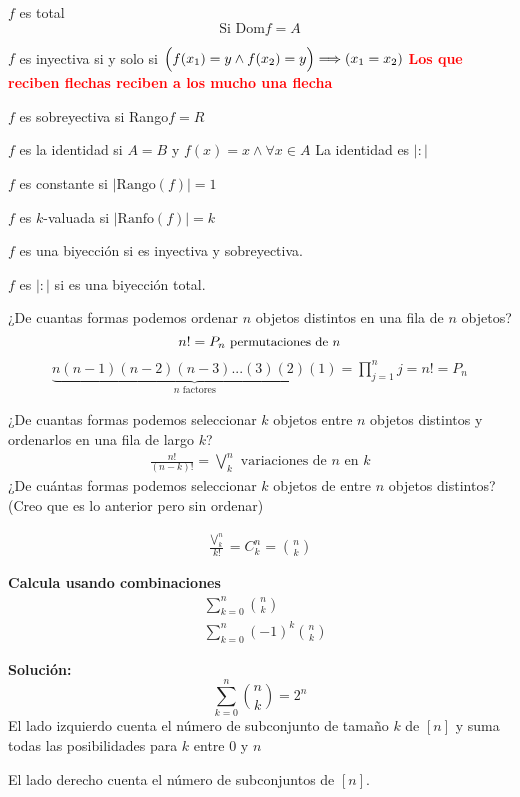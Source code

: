 \documentclass[../main.tex]{subfiles}
\begin{document}
$f$ es total
\[\text{Si Dom}f=A\]

$f$ es inyectiva si y solo si $\Big{(}f(x_1)=y\wedge f(x_2)=y\Big{)}\Longrightarrow(x_1=x_2)$
\textcolor{red}{ \textbf{Los que reciben flechas reciben a los mucho una flecha}}

$f$ es sobreyectiva si Rango$f=R$

$f$ es la identidad si $A=B$ y $f(x)=x \wedge \forall x\in A$
La identidad es $|:|$

$f$ es constante si $|\text{Rango}(f)|=1$

$f$ es $k$-valuada si $|\text{Ranfo}(f)|=k$

$f$ es una biyección si es inyectiva y sobreyectiva.

$f$ es $|:|$ si es una biyección total.

¿De cuantas formas podemos ordenar $n$ objetos distintos en una fila de $n$ objetos?
{\Huge
	\[n!=P_n\text{\small\ permutaciones de $n$}\]
}
\begin{align*}
	\underbrace{n(n-1)(n-2)(n-3)...(3)(2)(1)}_{\text{$n$ factores}}
	= \prod^n_{j=1}j=n!=P_n
\end{align*}

¿De cuantas formas podemos seleccionar $k$ objetos entre $n$ objetos distintos y
ordenarlos en una fila de largo $k$?
\begin{align*}
	\frac{n!}{(n-k)!} = \bigvee^n_k \text{\ variaciones de $n$ en $k$}
\end{align*}
¿De cuántas formas podemos seleccionar $k$ objetos de entre $n$ objetos distintos?
(Creo que es lo anterior pero sin ordenar)

\begin{align*}
	\frac{\bigvee^n_k}{k!}= C^n_k =
	\binom{n}{k}
\end{align*}

\textbf{Calcula usando combinaciones }
\begin{align*}
	&\sum^n_{k=0}\binom{n}{k}\\
	&\sum^n_{k=0}(-1)^k\binom{n}{k}
\end{align*}

\textbf{Solución:}
\[
	\sum_{k=0}^n\binom{n}{k}=2^n
\]
El lado izquierdo cuenta el número de subconjunto de tamaño $k$
de $[n]$ y suma todas las posibilidades para $k$ entre $0$ y $n$

El lado derecho cuenta el número de subconjuntos de $[n]$.
\end{document}
